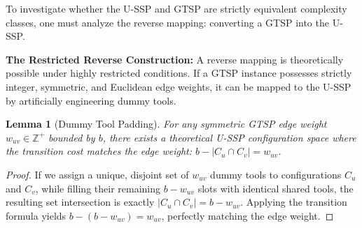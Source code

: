 \documentclass[12pt]{article}
\newtheorem{lemma}[theorem]{Lemma}
\begin{document}
To investigate whether the U-SSP and GTSP are strictly equivalent complexity classes, one must analyze the reverse mapping: converting a GTSP into the U-SSP.

\textbf{The Restricted Reverse Construction:} A reverse mapping is theoretically possible under highly restricted conditions. If a GTSP instance possesses strictly integer, symmetric, and Euclidean edge weights, it can be mapped to the U-SSP by artificially engineering dummy tools.

\begin{lemma}[Dummy Tool Padding]
	For any symmetric GTSP edge weight $w_{uv} \in \mathbb{Z}^+$ bounded by $b$, there exists a theoretical U-SSP configuration space where the transition cost matches the edge weight: $b - |C_u \cap C_v| = w_{uv}$.
\end{lemma}
\begin{proof}
	If we assign a unique, disjoint set of $w_{uv}$ dummy tools to configurations $C_u$ and $C_v$, while filling their remaining $b - w_{uv}$ slots with identical shared tools, the resulting set intersection is exactly $|C_u \cap C_v| = b - w_{uv}$. Applying the transition formula yields $b - (b - w_{uv}) = w_{uv}$, perfectly matching the edge weight.
\end{proof}
\end{document}
